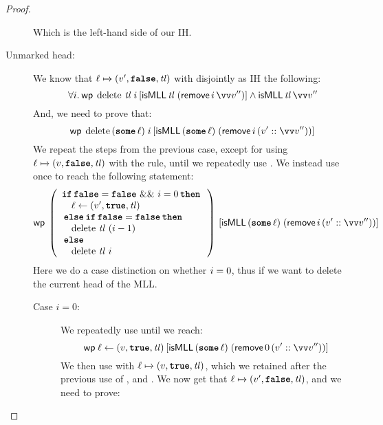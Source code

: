 \documentclass[thesis.tex]{subfiles}
\begin{document}
\begin{proof}
\begin{description}
\[              \]
              Which is the left-hand side of our IH.
        \item[Unmarked head:] We know that $\loc \fmapsto (\val', \False, \tl)$ with disjointly as IH the following:
              \[\All \iindex. \wpre{\MLLdelete\, \tl\; \iindex}{\isMLL\, \tl\; (\textlog{remove}\, \iindex\, \vect{\val}'')} \land \isMLL\, \tl\, \vect{\val}''\]
              And, we need to prove that:
              \[\wpre{\MLLdelete\, (\Some \loc)\; \iindex}{\isMLL\, (\Some \loc)\; (\textlog{remove}\, \iindex\, (\val' :: \vect{\val}''))}\]
              We repeat the steps from the previous case, except for using $\loc \fmapsto (\val, \False, \tl)$ with the  rule, until we repeatedly use . We instead use  once to reach the following statement:
              \[
                  \wpre{\left(
                      \begin{array}{l}
                              \If \False = \False\ \&\&\ \iindex = 0 then \\
                              \quad \loc \gets (\val', \True, \tl)        \\
                              \Else \If \False = \False then              \\
                              \quad \MLLdelete\,\tl\ (\iindex - 1)        \\
                              \Else                                       \\
                              \quad \MLLdelete\,\tl\ \iindex
                          \end{array}
                      \right)}{\isMLL\, (\Some \loc)\; (\textlog{remove}\, \iindex\, (\val' :: \vect{\val}''))}
              \]
              Here we do a case distinction on whether $i = 0$, thus if we want to delete the current head of the MLL.
              \begin{description}
                  \item[Case $i = 0$:] We repeatedly use  until we reach:
                        \[
                            \wpre{\loc \gets (\val, \True, \tl)}{\isMLL\, (\Some \loc)\; (\textlog{remove}\, 0\, (\val' :: \vect{\val}''))}
                        \]
                        We then use  with $\loc \fmapsto (\val, \True, \tl)$, which we retained after the previous use of , and . We now get that $\loc \fmapsto (\val', \False, \tl)$, and we need to prove:
                        \[
\]
\end{description}
\end{description}
\end{proof}
\end{document}
